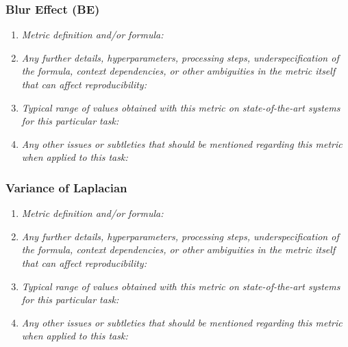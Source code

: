 \documentclass[a4paper,11pt]{article}
\begin{document}
        \subsubsection{Blur Effect (BE)}
            \begin{enumerate}[label=\alph*.]
                \item \textit{Metric definition and/or formula:}
                \bigskip
                \item \textit{Any further details, hyperparameters, processing steps, underspecification of the formula, context dependencies, or other ambiguities in the metric itself that can affect reproducibility:}
                \bigskip
                \item \textit{Typical range of values obtained with this metric on state-of-the-art systems for this particular task:}
                \bigskip
                \item \textit{Any other issues or subtleties that should be mentioned regarding this metric when applied to this task:}
                \bigskip
            \end{enumerate}
        \subsubsection{Variance of Laplacian}
            \begin{enumerate}[label=\alph*.]
                \item \textit{Metric definition and/or formula:}
                \bigskip
                \item \textit{Any further details, hyperparameters, processing steps, underspecification of the formula, context dependencies, or other ambiguities in the metric itself that can affect reproducibility:}
                \bigskip
                \item \textit{Typical range of values obtained with this metric on state-of-the-art systems for this particular task:}
                \bigskip
                \item \textit{Any other issues or subtleties that should be mentioned regarding this metric when applied to this task:}
                \bigskip
            \end{enumerate}
\end{document}
